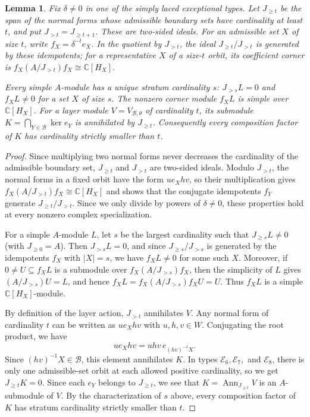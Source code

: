 \documentclass[11pt,a4paper]{amsart}
\newtheorem{lemma}[theorem]{Lemma}
\theoremstyle{uprightdefinition}
\theoremstyle{remark}\newtheorem{remark}[theorem]{Remark}
\begin{document}
\begin{lemma}
\label{lem:specialized-layer-detection}
Fix $\delta\ne0$ in one of the simply laced exceptional types.
Let $J_{\ge t}$ be the span of the normal forms whose admissible
boundary sets have cardinality at least $t$, and put
$J_{>t}=J_{\ge t+1}$. These are two-sided ideals. For an admissible
set $X$ of size $t$, write $f_X=\delta^{-t}e_X$.
In the quotient by $J_{>t}$, the ideal $J_{\ge t}/J_{>t}$ is generated
by these idempotents; for a representative $X$ of a size-$t$ orbit,
its coefficient corner is $f_X(A/J_{>t})f_X\cong\mathbb C[H_X]$.

Every simple $A$-module has a unique stratum cardinality $s$:
$J_{>s}L=0$ and $f_XL\ne0$ for a set $X$ of size $s$.
The nonzero corner module $f_XL$ is simple over $\mathbb C[H_X]$.
For a layer module $V=V_{\mathcal B,\theta}$ of cardinality $t$, its
submodule $K=\bigcap_{Y\in\mathcal B}\ker e_Y$ is annihilated by
$J_{\ge t}$. Consequently every composition factor of $K$ has
cardinality strictly smaller than $t$.
\end{lemma}
\begin{proof}
Since multiplying two normal forms never decreases the cardinality of the admissible boundary set, $J_{\ge t}$ and $J_{>t}$ are two-sided ideals. Modulo $J_{>t}$,
the normal forms in a fixed orbit have the form $u e_X h v$, so
their multiplication gives $f_X(A/J_{>t})f_X\cong\mathbb C[H_X]$ and shows
that the conjugate idempotents $f_Y$ generate $J_{\ge t}/J_{>t}$.
Since we only divide by powers of $\delta\ne0$, these properties hold at every nonzero complex specialization.

For a simple $A$-module $L$, let $s$ be the largest cardinality
such that $J_{\ge s}L\ne0$ (with $J_{\ge0}=A$).
Then $J_{>s}L=0$, and since $J_{\ge s}/J_{>s}$ is generated by the idempotents $f_X$ with $|X|=s$,
we have $f_XL\ne0$ for some such $X$. Moreover, if
$0\ne U\subseteq f_XL$ is a submodule over $f_X(A/J_{>s})f_X$, then the simplicity of $L$ gives
$(A/J_{>s})U=L$, and hence
$f_XL=f_X(A/J_{>s})f_XU=U$. Thus $f_XL$ is a simple $\mathbb C[H_X]$-module.

By definition of the layer action, $J_{>t}$ annihilates $V$. Any normal form
of cardinality $t$ can be written as $u e_X h v$ with $u,h,v\in W$. Conjugating the root product, we have
\[
 u e_X h v=u h v\,e_{(hv)^{-1}X}.
\]
Since $(hv)^{-1}X\in\mathcal B$, this element
annihilates $K$. In types $\mathscr{E}_6,\mathscr{E}_7,$ and $\mathscr{E}_8$, there is only one admissible-set
orbit at each allowed positive cardinality, so we get $J_{\ge t}K=0$.
Since each $e_Y$ belongs to $J_{\ge t}$, we see that
$K=\operatorname{Ann}_{J_{\ge t}}V$ is an $A$-submodule of $V$.
By the characterization of $s$ above, every composition factor of $K$ has
stratum cardinality strictly smaller than $t$.
\end{proof}
\end{document}
